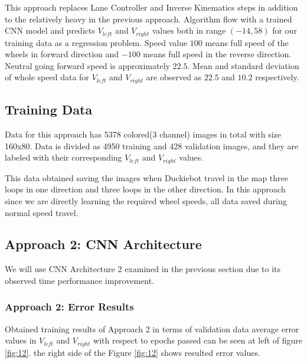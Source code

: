 \documentclass[11pt,letterpaper]{article}
\begin{document}
	This approach replaces Lane Controller and Inverse Kinematics steps in addition to the relatively heavy in the previous approach. Algorithm flow with a trained CNN model and predicts $V_{left}$ and $V_{right}$ values both in range $(-14, 58)$ for our training data as a regression problem. Speed value $100$ means full speed of the wheels in forward direction and $-100$ means full speed in the reverse direction. Neutral going forward speed is approximately $22.5$. Mean and standard deviation of whole speed data for $V_{left}$ and $V_{right}$ are observed as $22.5$ and $10.2$ respectively.
	
	\subsection{Training Data}
	Data for this approach has 5378 colored(3 channel) images in total with size 160x80. Data is divided as 4950 training and 428 validation images, and they are labeled with their corresponding $V_{left}$ and $V_{right}$ values.
	
	This data obtained saving the images when Duckiebot travel in the map three loops in one direction and three loops in the other direction. In this approach since we are directly learning the required wheel speeds, all data saved during normal speed travel.
	
	\subsection{Approach 2: CNN Architecture}
	We will use CNN Architecture 2 examined in the previous section due to its observed time performance improvement.
	
	\subsubsection{Approach 2: Error Results}
	Obtained training results of Approach 2 in terms of validation data average error values in $V_{left}$ and $V_{right}$ with respect to epochs passed can be seen at left of figure \ref{fig:12}. the right side of the Figure \ref{fig:12} shows resulted error values.
	
\end{document}
